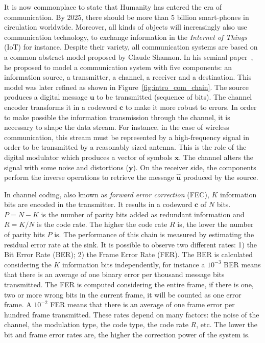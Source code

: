It is now commonplace to state that Humanity has entered the era of
communication. By 2025, there should be more than 5 billion smart-phones in
circulation worldwide. Moreover, all kinds of objects will increasingly also use
communication technology, to exchange information in the \emph{Internet of
Things} (IoT) for instance. Despite their variety, all communication systems are
based on a common abstract model proposed by Claude Shannon. In his seminal
paper~\cite{Shannon1948}, he proposed to model a communication system with five
components: an information source, a transmitter, a channel, a receiver and a
destination. This model was later refined as shown in
Figure~\ref{fig:intro_com_chain}. The source produces a digital message $\bm{u}$
to be transmitted (sequence of bits). The channel encoder transforms it in a
codeword $\bm{c}$ to make it more robust to errors. In order to make possible
the information transmission through the channel, it is necessary to shape the
data stream. For instance, in the case of wireless communication, this stream
must be represented by a high-frequency signal in order to be transmitted by a
reasonably sized antenna. This is the role of the digital modulator which
produces a vector of symbols $\bm{x}$. The channel alters the signal with some
noise and distortions ($\bm{y}$). On the receiver side, the components perform
the inverse operations to retrieve the message $\bm{\hat{u}}$ produced by the
source.

In channel coding, also known as \emph{forward error correction} (FEC), $K$
information bits  are encoded in the transmitter. It results in a codeword
$\bm{c}$ of $N$ bits. $P = N - K$ is the number of parity bits added as
redundant information and $R = K/N$ is the code rate. The higher the code rate
$R$ is, the lower the number of parity bits $P$ is. The performance of this
chain is measured by estimating the residual error rate at the sink. It is
possible to observe two different rates: 1) the Bit Error Rate (BER); 2) the
Frame Error Rate (FER). The BER is calculated considering the $K$ information
bits independently, for instance a $10^{-3}$ BER means that there is an average
of one binary error per thousand message bits transmitted. The FER is computed
considering the entire frame, if there is one, two or more wrong bits in the
current frame, it will be counted as one error frame. A $10^{-2}$ FER means that
there is an average of one frame error per hundred frame transmitted. These
rates depend on many factors: the noise of the channel, the modulation
type, the code type, the code rate $R$, etc. The lower the bit and frame error
rates are, the higher the correction power of the system is.

